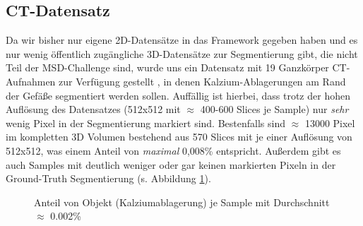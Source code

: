 \subsection{CT-Datensatz}
Da wir bisher nur eigene 2D-Datensätze in das Framework gegeben haben und es nur wenig öffentlich zugängliche 3D-Datensätze zur Segmentierung gibt, die nicht Teil der MSD-Challenge \cite{msdChallenge} sind, wurde uns ein Datensatz mit 19 Ganzkörper CT-Aufnahmen zur Verfügung gestellt \cite{ctDatensatz}, in denen Kalzium-Ablagerungen am Rand der Gefäße segmentiert werden sollen.
Auffällig ist hierbei, dass trotz der hohen Auflösung des Datensatzes (512x512 mit $\approx$ 400-600 Slices je Sample) nur \textit{sehr} wenig Pixel in der Segmentierung markiert sind. Bestenfalls sind $\approx$ 13000 Pixel im kompletten 3D Volumen bestehend aus 570 Slices mit je einer Auflösung von 512x512, was einem Anteil von \textit{maximal} 0,008\% entspricht. Außerdem gibt es auch Samples mit deutlich weniger oder gar keinen markierten Pixeln in der Ground-Truth Segmentierung (s. Abbildung \ref{pic:Haeuf_109}).

\begin{figure}[H]


\caption{Anteil von Objekt (Kalziumablagerung) je Sample mit Durchschnitt $\approx$ 0.002\%}
\label{pic:Haeuf_109}
\end{figure}


